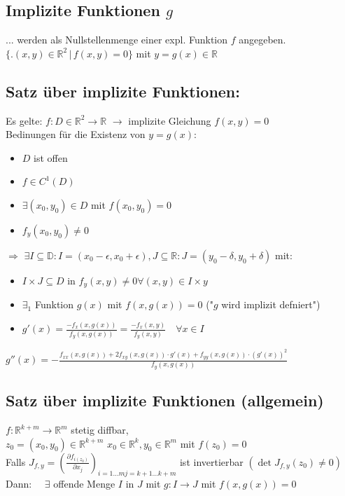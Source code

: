\documentclass[6pt,a4paper]{scrartcl}
\newcommand{\iset}[2]{\ensuremath{\bigl\{ \bigl. #1 \, \bigr| \, #2 \bigr\}}}					%
\renewcommand{\emph}[1]{\textbf{#1}}															%
\newcommand{\Ra}[0]{\ensuremath{\Rightarrow}}									%
\newcommand{\ra}[0]{\ensuremath{\rightarrow}} 									%
\begin{document}
\begin{multicols*}{4}
\section{Implizite Funktionen $g$}
... werden als Nullstellenmenge einer expl. Funktion $f$ angegeben.\\
$\iset{(x,y) \in \mathbb R^2 }{f(x,y) = 0}$ mit $y=g(x) \in \mathbb R$

\subsection{Satz über implizite Funktionen:}
Es gelte: $f: D \in \mathbb R^2 \ra \mathbb R$ \quad
$\ra $ implizite Gleichung $f(x,y) = 0$ \\
Bedinungen für die Existenz von $y = g(x)$:
\begin{itemize} \itemsep0pt
	\item $D$ ist offen
	\item $f \in C^1 (D)$
	\item $\exists (x_0, y_0) \in D$ mit $f(x_0, y_0) = 0$
	\item $f_y(x_0, y_0) \not = 0$
\end{itemize}
\emph{$\Ra$} $ \exists I \subseteq \mathbb D: I = (x_0 - \epsilon, x_0 + \epsilon) , J \subseteq \mathbb R: J = (y_0 - \delta, y_0 + \delta)$ mit:
\begin{itemize}\itemsep0pt
	\item $I \times J \subseteq D$ in $f_y (x,y) \not = 0 \forall (x,y) \in I \times y$
	\item $\exists_1$ Funktion $g(x)$ mit $f(x,g(x)) = 0$ ("$g$ wird implizit defniert")
	\item $g'(x) = \frac{-f_x(x, g(x))}{f_y (x, g(x))} = \frac{-f_x(x, y)}{f_y (x, y)} \quad \forall x \in I$ 
\end{itemize}

	
$g''(x) = - \frac{f_{xx} (x, g(x)) + 2f_{xy}(x,g(x)) \cdot g'(x) + f_{yy} (x, g(x)) \cdot (g'(x))^2}{f_y (x, g(x))} $

\subsection{Satz über implizite Funktionen (allgemein)}
$f: \mathbb R^{k+m} \ra \mathbb R^m$ stetig diffbar,\\ $z_0 = (x_0, y_0) \in \mathbb R^{k+m}$  	$x_0 \in \mathbb R^k, y_0 \in \mathbb R^m$ mit $f(z_0) = 0$
\\
Falls $J_{f,y} = (\frac{\partial f_{i(z_0)}}{\partial x_j})_{i = 1 \ldots m j= k +1 \ldots k+m}$ ist invertierbar $(\det J_{f,y} (z_0) \not = 0)$
\\
Dann: $\quad \exists$ offende Menge $I$ in $J$ mit $g: I \ra J$ mit $f(x,g(x)) = 0$ 



\end{multicols*}
\end{document}
